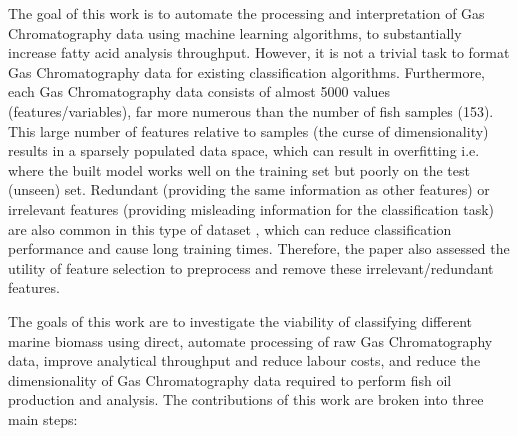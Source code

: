 \documentclass[runningheads]{llncs}
\begin{document}

The goal of this work is to automate the processing and interpretation of Gas Chromatography data using machine learning algorithms, to substantially increase fatty acid analysis throughput. 
However, it is not a trivial task to format Gas Chromatography data for existing classification algorithms. 
Furthermore, each Gas Chromatography data consists of almost 5000 values (features/variables), far more numerous than the number of fish samples (153). 
This large number of features relative to samples (the curse of dimensionality) results in a sparsely populated data space, which can result in overfitting i.e. where the built model works well on the training set but poorly on the test (unseen) set. 
Redundant (providing the same information as other features) or irrelevant features (providing misleading information for the classification task) are also common in this type of dataset \cite{nguyen2020survey}, which can reduce classification performance and cause long training times. 
Therefore, the paper also assessed the utility of feature selection to preprocess and remove these irrelevant/redundant features.

The goals of this work are to investigate the viability of classifying different marine biomass using direct, automate processing of raw Gas Chromatography data, improve analytical throughput and reduce labour costs, and reduce the dimensionality of Gas Chromatography data required to perform fish oil production and analysis. 
The contributions of this work are broken into three main steps:
\end{document}
